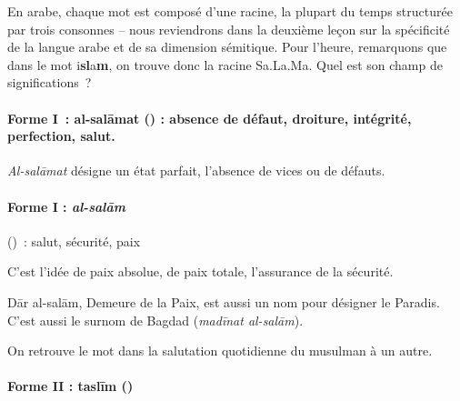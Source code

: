 
En arabe, chaque mot est composé d'une racine, la plupart du temps
structurée par trois consonnes -- nous reviendrons dans la deuxième
leçon sur la spécificité de la langue arabe et de sa dimension
sémitique. Pour l'heure, remarquons que dans le mot
i\textbf{sl}a\textbf{m}, on trouve donc la racine Sa.La.Ma. Quel est son
champ de significations~?

 
\paragraph{Forme I~: al-salāmat () :
absence de défaut, droiture, intégrité, perfection, salut.
}

\emph{Al-salāmat} désigne un état parfait, l'absence de vices ou de
défauts.

\paragraph{ Forme I : \emph{al-salām}} (\textbf{})~: salut, sécurité,
paix

C'est l'idée de paix absolue, de paix totale, l'assurance de la
sécurité.

Dār al-salām, Demeure de la Paix, est aussi un nom pour désigner le
Paradis. C'est aussi le surnom de Bagdad (\emph{madīnat al-salām}).

On retrouve le mot dans la salutation quotidienne du musulman à un
autre.


\paragraph{ Forme II : taslīm
()~}

